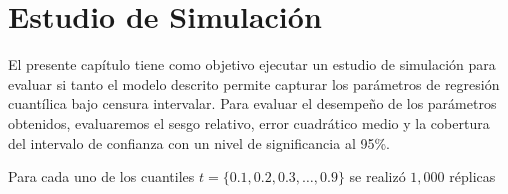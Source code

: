 \chapter{Estudio de Simulación}
El presente capítulo tiene como objetivo ejecutar un estudio de simulación para evaluar si tanto el modelo descrito permite capturar los parámetros de regresión cuantílica bajo censura intervalar. Para evaluar el desempeño de los parámetros obtenidos, evaluaremos el sesgo relativo, error cuadrático medio y la cobertura del intervalo de confianza con un nivel de significancia al 95\%.

Para cada uno de los cuantiles $t=\{0.1, 0.2, 0.3, \dots , 0.9\}$ se realizó $1,000$ réplicas